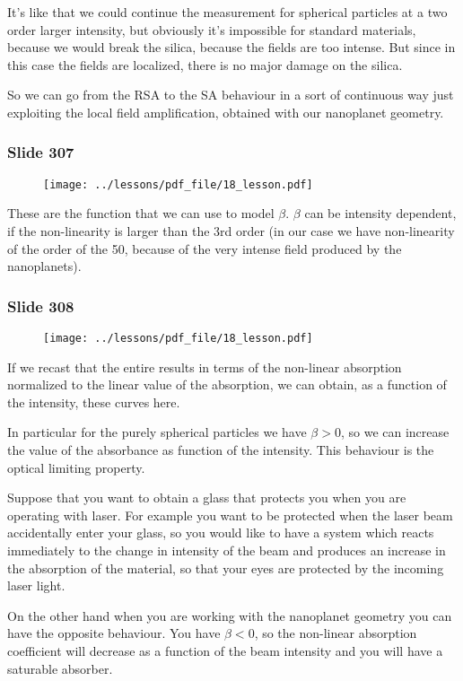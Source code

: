 \documentclass[../main/main.tex]{subfiles}
\begin{document}
 It’s like that we could continue the measurement for spherical particles at a two order larger intensity, but obviously it’s impossible for standard materials, because we would break the silica, because the fields are too intense.
But since in this case the fields are localized, there is no major damage on the silica.

So we can go from the RSA to the SA behaviour in a sort of continuous way just exploiting the local field amplification, obtained with our nanoplanet geometry.

\newpage

\subsubsection{Slide 307}

\begin{figure}[h!]
\centering
\texttt{[image: ../lessons/pdf\_file/18\_lesson.pdf]}
\end{figure}


These are the function that we can use to model $\beta$.
$\beta$ can be intensity dependent, if the non-linearity is larger than the 3rd order (in our case we have non-linearity of the order of the 50, because of the very intense field produced by the nanoplanets).


\newpage

\subsubsection{Slide 308}

\begin{figure}[h!]
\centering
\texttt{[image: ../lessons/pdf\_file/18\_lesson.pdf]}
\end{figure}

If we recast that the entire results in terms of the non-linear absorption normalized to the linear value of the absorption, we can obtain, as a function of the intensity, these curves here.

In particular for the purely spherical particles we have $\beta>0$, so we can increase the value of the absorbance as function of the intensity. This behaviour is the optical limiting property. 

Suppose that you want to obtain a glass that protects you when you are operating with laser.
For example you want to be protected when the laser beam accidentally enter your glass, so you would like to have a system which reacts immediately to the change in intensity of the beam and produces an increase in the absorption of the material, so that your eyes are protected by the incoming laser light.

On the other hand when you are working with the nanoplanet geometry you can have the opposite behaviour.
You have $\beta<0$, so the non-linear absorption coefficient will decrease as a function of the beam intensity and you will have a saturable absorber. 

\clearpage
\end{document}
